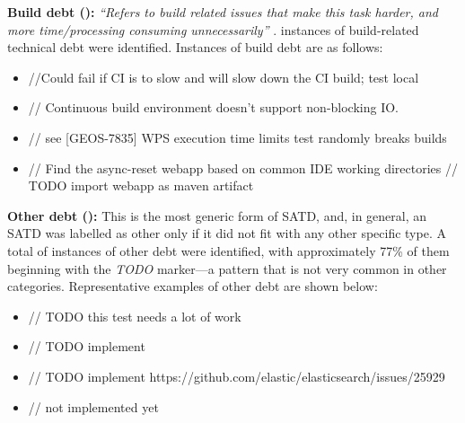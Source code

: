 \textbf{Build debt (\buildCount{}):} \textit{``Refers to build related issues that make this task harder, and more time/processing consuming unnecessarily''} \cite{alves_towards_2014}. \buildCount{} instances of build-related technical debt were identified. Instances of build debt are as follows:

\begin{itemize}[itemsep=-2pt]
    \item \textcolor{commentColor}{//Could fail if CI is to slow and will slow down the CI build; test local}
    \item \textcolor{commentColor}{// Continuous build environment doesn't support non-blocking IO.}
    \item \textcolor{commentColor}{// see [GEOS-7835] WPS execution time limits test randomly breaks builds}
    \item \textcolor{commentColor}{// Find the async-reset webapp based on common IDE working directories
// TODO import webapp as maven artifact}
\end{itemize}


\textbf{Other debt (\otherCount{}):} This is the most generic form of SATD, and, in general, an SATD was labelled as other only if it did not fit with any other specific type. A total of \otherCount{} instances of other debt were identified, with approximately 77\% of them beginning with the \textit{TODO} marker—a pattern that is not very common in other categories. Representative examples of other debt are shown below:
\begin{itemize}[itemsep=-2pt]
    \item \textcolor{commentColor}{// TODO this test needs a lot of work}
    \item \textcolor{commentColor}{// TODO implement}
    \item \textcolor{commentColor}{// TODO implement https://github.com/elastic/\newline elasticsearch/issues/25929}
    \item \textcolor{commentColor}{// not implemented yet}
\end{itemize}


